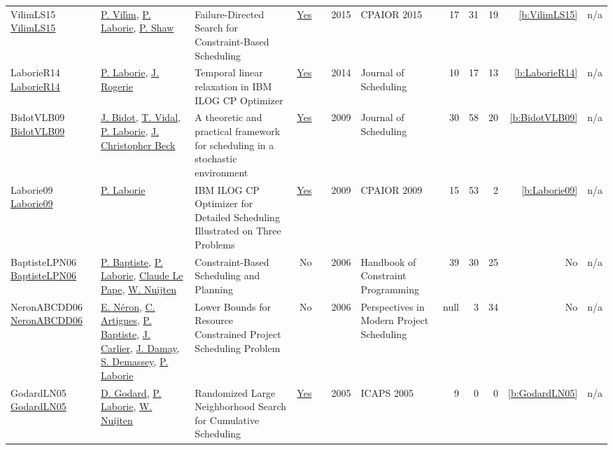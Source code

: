 {\begin{longtable}{>{\raggedright\arraybackslash}p{3cm}>{\raggedright\arraybackslash}p{6cm}>{\raggedright\arraybackslash}p{6.5cm}rrrp{2.5cm}rrrrr}
VilimLS15 \href{https://doi.org/10.1007/978-3-319-18008-3_30}{VilimLS15} & \hyperref[auth:a121]{P. Vil{\'{\i}}m}, \hyperref[auth:a118]{P. Laborie}, \hyperref[auth:a120]{P. Shaw} & Failure-Directed Search for Constraint-Based Scheduling & \href{../works/VilimLS15.pdf}{Yes} & \cite{VilimLS15} & 2015 & CPAIOR 2015 & 17 & 31 & 19 & \ref{b:VilimLS15} & n/a\\
LaborieR14 \href{http://dx.doi.org/10.1007/s10951-014-0408-7}{LaborieR14} & \hyperref[auth:a118]{P. Laborie}, \hyperref[auth:a1084]{J. Rogerie} & Temporal linear relaxation in IBM ILOG CP Optimizer & \href{../works/LaborieR14.pdf}{Yes} & \cite{LaborieR14} & 2014 & Journal of Scheduling & 10 & 17 & 13 & \ref{b:LaborieR14} & n/a\\
BidotVLB09 \href{https://doi.org/10.1007/s10951-008-0080-x}{BidotVLB09} & \hyperref[auth:a830]{J. Bidot}, \hyperref[auth:a831]{T. Vidal}, \hyperref[auth:a118]{P. Laborie}, \hyperref[auth:a89]{J. Christopher Beck} & A theoretic and practical framework for scheduling in a stochastic environment & \href{../works/BidotVLB09.pdf}{Yes} & \cite{BidotVLB09} & 2009 & Journal of Scheduling & 30 & 58 & 20 & \ref{b:BidotVLB09} & n/a\\
Laborie09 \href{https://doi.org/10.1007/978-3-642-01929-6_12}{Laborie09} & \hyperref[auth:a118]{P. Laborie} & {IBM} {ILOG} {CP} Optimizer for Detailed Scheduling Illustrated on Three Problems & \href{../works/Laborie09.pdf}{Yes} & \cite{Laborie09} & 2009 & CPAIOR 2009 & 15 & 53 & 2 & \ref{b:Laborie09} & n/a\\
BaptisteLPN06 \href{https://doi.org/10.1016/S1574-6526(06)80026-X}{BaptisteLPN06} & \hyperref[auth:a163]{P. Baptiste}, \hyperref[auth:a118]{P. Laborie}, \hyperref[auth:a164]{Claude Le Pape}, \hyperref[auth:a662]{W. Nuijten} & Constraint-Based Scheduling and Planning & No & \cite{BaptisteLPN06} & 2006 & Handbook of Constraint Programming & 39 & 30 & 25 & No & n/a\\
NeronABCDD06 \href{http://dx.doi.org/10.1007/978-0-387-33768-5_7}{NeronABCDD06} & \hyperref[auth:a906]{E. Néron}, \hyperref[auth:a6]{C. Artigues}, \hyperref[auth:a163]{P. Baptiste}, \hyperref[auth:a852]{J. Carlier}, \hyperref[auth:a907]{J. Damay}, \hyperref[auth:a245]{S. Demassey}, \hyperref[auth:a118]{P. Laborie} & Lower Bounds for Resource Constrained Project Scheduling Problem & No & \cite{NeronABCDD06} & 2006 & Perspectives in Modern Project Scheduling & null & 3 & 34 & No & n/a\\
GodardLN05 \href{http://www.aaai.org/Library/ICAPS/2005/icaps05-009.php}{GodardLN05} & \hyperref[auth:a780]{D. Godard}, \hyperref[auth:a118]{P. Laborie}, \hyperref[auth:a662]{W. Nuijten} & Randomized Large Neighborhood Search for Cumulative Scheduling & \href{../works/GodardLN05.pdf}{Yes} & \cite{GodardLN05} & 2005 & ICAPS 2005 & 9 & 0 & 0 & \ref{b:GodardLN05} & n/a\\

\end{longtable}}
